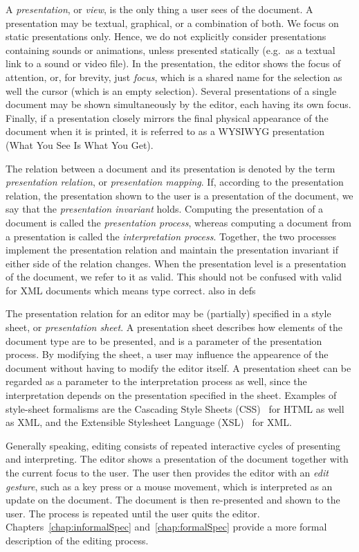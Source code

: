 A {\em presentation}, or {\em view}, is the only thing a user sees of the document. A presentation may be textual, graphical, or a combination of both. We focus on static presentations only. Hence, we do not explicitly consider presentations containing sounds or animations, unless presented statically (e.g.\ as a textual link to a sound or video file). In the presentation, the editor shows the focus of attention, or, for brevity, just {\em focus}, which is a shared name for the selection as well the cursor (which is an empty selection).  Several presentations of a single document may be shown simultaneously by the editor, each having its own focus. Finally, if a presentation closely mirrors the final physical appearance of the document when it is printed, it is referred to as a WYSIWYG presentation (What You See Is What You Get).

The relation between a document and its presentation is denoted by the term {\em presentation relation}, or {\em presentation mapping}. If, according to the presentation relation, the presentation shown to the user is a presentation of the document, we say that the {\em presentation invariant} holds. Computing the presentation of a document is called the {\em presentation process}, whereas computing a document from a presentation is called the {\em interpretation process}. Together, the two processes implement the presentation relation and maintain the presentation invariant if either side of the relation changes.
\bc
When the presentation level is a presentation of the document, we refer to it as valid. This should not be confused with valid for XML documents which means type correct.
also in defs
\ec

The presentation relation for an editor may be (partially) specified in a style sheet, or {\em presentation sheet}. A presentation sheet describes how elements of the document type are to be presented, and is a parameter of the presentation process. By modifying the sheet, a user may influence the appearence of the document without having to modify the editor itself. A presentation sheet can be regarded as a parameter to the interpretation process as well, since the interpretation depends on the presentation specified in the sheet. Examples of style-sheet formalisms are the Cascading Style Sheets (CSS)~\cite{css2} for HTML as well as XML, and the Extensible Stylesheet Language (XSL)~\cite{xsl10} for XML.

Generally speaking, editing consists of repeated interactive cycles of presenting and interpreting. The editor shows a presentation of the document together with the current focus to the user. The user then provides the editor with an {\em edit gesture}, such as a key press or a mouse movement, which is interpreted as an update on the document. The document is then re-presented and shown to the user. The process is repeated until the user quits the editor. Chapters~\ref{chap:informalSpec} and~\ref{chap:formalSpec} provide a more formal description of the editing process.

